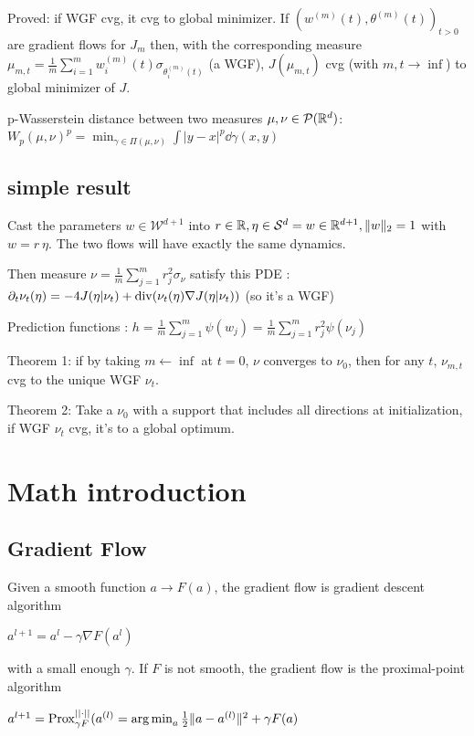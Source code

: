 Proved: if WGF cvg, it cvg to global minimizer. If $(w^{(m)}(t), \theta^{(m)}(t))_{t>0}$ are gradient flows for $J_m$ then, with the corresponding measure $\mu_{m,t} = \frac{1}{m} \sum_{i=1}^{m} w^{(m)}_i(t) \sigma_{\theta_i^{(m)}(t)}$ (a WGF), $J(\mu_{m, t})$ cvg (with $m, t \rightarrow \inf$) to global minimizer of $J$.

p-Wasserstein distance between two measures $\mu, \nu \in \mathcal{P}(\mathbb{R}^d)$: $W_p(\mu, \nu)^p = \min_{\gamma \in \Pi(\mu, \nu)} \int |y - x|^p \dd \gamma(x, y)$

\subsection{simple result}

Cast the parameters $w \in \mathcal{W}^{d+1}$ into $r \in \mathbb{R}, \eta \in \mathcal{S}^d = {w \in \mathbb{R}^{d+1}, \lVert w\rVert_2 = 1}$ with $w = r ~ \eta$. The two flows will have exactly the same dynamics.

Then measure $\nu= \frac{1}{m}\sum_{j=1}^{m} r^2_j \sigma_{\nu}$ satisfy this PDE : $\partial_t \nu_t(\eta) = -4 J(\eta | \nu_t) + \operatorname*{div}(\nu_t(\eta) \nabla J(\eta | \nu_t)) $ (so it's a WGF)

Prediction functions : $h = \frac{1}{m} \sum_{j=1}^{m} \psi(w_j) = \frac{1}{m}\sum_{j=1}^{m} r_j^2 \psi(\nu_j)$

Theorem 1: if by taking $m \leftarrow \inf$ at $t=0$, $\nu$ converges to $\nu_0$, then for any $t$, $\nu_{m, t}$ cvg to the unique WGF $\nu_t$.

Theorem 2: Take a $\nu_0$ with a support that includes all directions at initialization, if WGF $\nu_t$ cvg, it's to a global optimum.

\section{Math introduction}

\subsection{Gradient Flow}

Given a smooth function $a \rightarrow F(a)$, the gradient flow is gradient descent algorithm

$a^{l+1} = a^l - \gamma \nabla F(a^l)$

with a small enough $\gamma$. If $F$ is not smooth, the gradient flow is the proximal-point algorithm

$a^{l+1} = \operatorname{Prox}^{||\cdot ||}_{\gamma F}(a^{(l)} = \operatorname*{arg\,min}_a \frac{1}{2} \lVert a - a^{(l)}\rVert^2 + \gamma F(a)$

